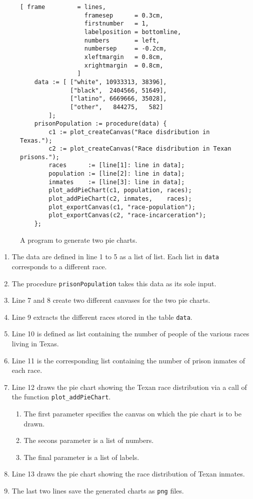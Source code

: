 \begin{figure}[!ht]
\centering
\begin{Verbatim}[ frame         = lines, 
                  framesep      = 0.3cm, 
                  firstnumber   = 1,
                  labelposition = bottomline,
                  numbers       = left,
                  numbersep     = -0.2cm,
                  xleftmargin   = 0.8cm,
                  xrightmargin  = 0.8cm,
                ]
    data := [ ["white", 10933313, 38396],
              ["black",  2404566, 51649],
              ["latino", 6669666, 35028],
              ["other",   844275,   582]
        ];
    prisonPopulation := procedure(data) {
        c1 := plot_createCanvas("Race disdribution in Texas.");
        c2 := plot_createCanvas("Race disdribution in Texan prisons.");
        races      := [line[1]: line in data];
        population := [line[2]: line in data];
        inmates    := [line[3]: line in data];
        plot_addPieChart(c1, population, races);
        plot_addPieChart(c2, inmates,    races);
        plot_exportCanvas(c1, "race-population");
        plot_exportCanvas(c2, "race-incarceration");
    };
\end{Verbatim}
\vspace*{-0.3cm}
\caption{A program to generate two pie charts.}
\label{fig:race-and-incarceration.stlx}
\end{figure}

\begin{enumerate}
\item The data are defined in line 1 to 5 as a list of list.  Each list in \texttt{data} corresponds
      to a different race. 
\item The procedure \texttt{prisonPopulation} takes this data as its sole input.
\item Line 7 and 8 create two different canvases for the two pie charts.
\item Line 9 extracts the different races stored in the table \texttt{data}.
\item Line 10 is defined as list containing the number of people of the various races living in
      Texas.
\item Line 11 is the corresponding list containing the number of prison inmates of each race.
\item Line 12 draws the pie chart showing the Texan race distribution via a call of the function
      \texttt{plot\_addPieChart}.
      \begin{enumerate}
      \item The first parameter specifies the canvas on which the pie chart is to be drawn.
      \item The secons parameter is a list of numbers.
      \item The final parameter is a list of labels.
      \end{enumerate}
\item Line 13 draws the pie chart showing the  race distribution of Texan inmates.
\item The last two lines save the generated charts as \texttt{png} files.
\end{enumerate}

